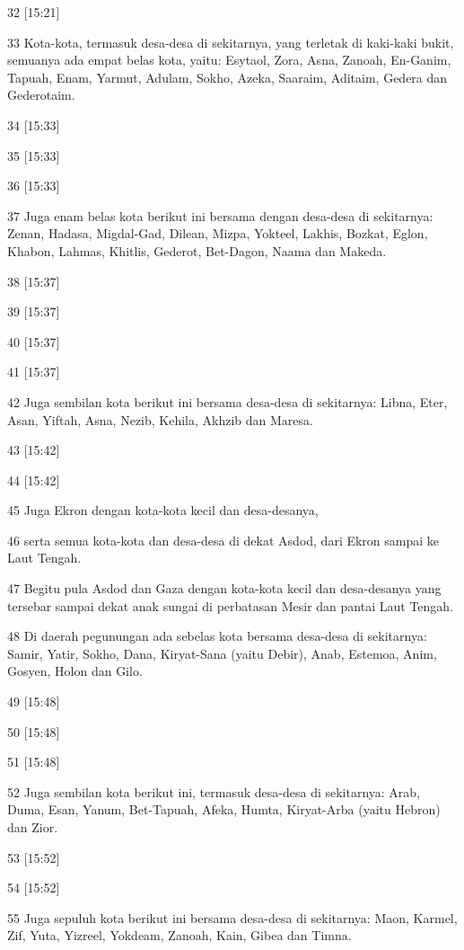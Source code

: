 \par 32 [15:21]
\par 33 Kota-kota, termasuk desa-desa di sekitarnya, yang terletak di kaki-kaki bukit, semuanya ada empat belas kota, yaitu: Esytaol, Zora, Asna, Zanoah, En-Ganim, Tapuah, Enam, Yarmut, Adulam, Sokho, Azeka, Saaraim, Aditaim, Gedera dan Gederotaim.
\par 34 [15:33]
\par 35 [15:33]
\par 36 [15:33]
\par 37 Juga enam belas kota berikut ini bersama dengan desa-desa di sekitarnya: Zenan, Hadasa, Migdal-Gad, Dilean, Mizpa, Yokteel, Lakhis, Bozkat, Eglon, Khabon, Lahmas, Khitlis, Gederot, Bet-Dagon, Naama dan Makeda.
\par 38 [15:37]
\par 39 [15:37]
\par 40 [15:37]
\par 41 [15:37]
\par 42 Juga sembilan kota berikut ini bersama desa-desa di sekitarnya: Libna, Eter, Asan, Yiftah, Asna, Nezib, Kehila, Akhzib dan Maresa.
\par 43 [15:42]
\par 44 [15:42]
\par 45 Juga Ekron dengan kota-kota kecil dan desa-desanya,
\par 46 serta semua kota-kota dan desa-desa di dekat Asdod, dari Ekron sampai ke Laut Tengah.
\par 47 Begitu pula Asdod dan Gaza dengan kota-kota kecil dan desa-desanya yang tersebar sampai dekat anak sungai di perbatasan Mesir dan pantai Laut Tengah.
\par 48 Di daerah pegunungan ada sebelas kota bersama desa-desa di sekitarnya: Samir, Yatir, Sokho, Dana, Kiryat-Sana (yaitu Debir), Anab, Estemoa, Anim, Gosyen, Holon dan Gilo.
\par 49 [15:48]
\par 50 [15:48]
\par 51 [15:48]
\par 52 Juga sembilan kota berikut ini, termasuk desa-desa di sekitarnya: Arab, Duma, Esan, Yanum, Bet-Tapuah, Afeka, Humta, Kiryat-Arba (yaitu Hebron) dan Zior.
\par 53 [15:52]
\par 54 [15:52]
\par 55 Juga sepuluh kota berikut ini bersama desa-desa di sekitarnya: Maon, Karmel, Zif, Yuta, Yizreel, Yokdeam, Zanoah, Kain, Gibea dan Timna.
